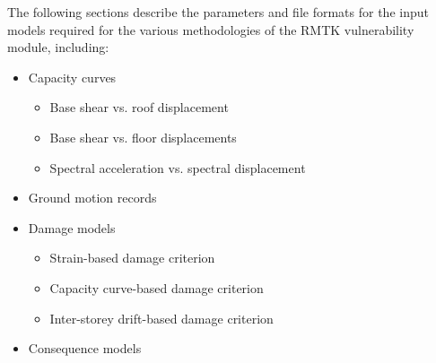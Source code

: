The following sections describe the parameters and file formats for the input models required for the various methodologies of the RMTK vulnerability module, including:

\begin{itemize}
  \item Capacity curves
  \begin{itemize}
  	\item Base shear vs. roof displacement
  	\item Base shear vs. floor displacements
  	\item Spectral acceleration vs. spectral displacement
  \end{itemize}
  \item Ground motion records
  \item Damage models
  \begin{itemize}
  	\item Strain-based damage criterion
  	\item Capacity curve-based damage criterion
  	\item Inter-storey drift-based damage criterion
  \end{itemize}
  \item Consequence models
\end{itemize}